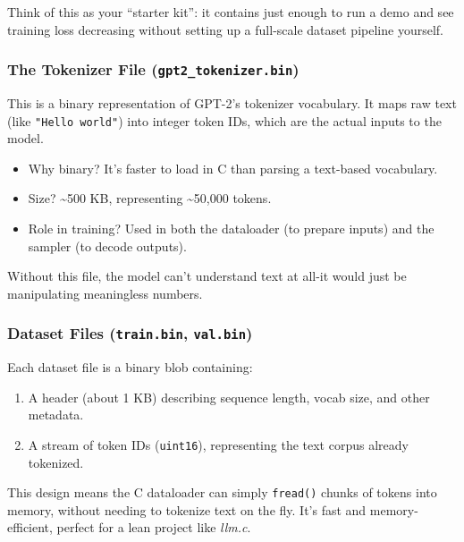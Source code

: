 \documentclass[
  letterpaper,
  DIV=11,
  numbers=noendperiod]{scrreprt}
\providecommand{\tightlist}{%
  \setlength{\itemsep}{0pt}\setlength{\parskip}{0pt}}
\begin{document}
Think of this as your ``starter kit'': it contains just enough to run a
demo and see training loss decreasing without setting up a full-scale
dataset pipeline yourself.

\subsubsection{\texorpdfstring{The Tokenizer File
(\texttt{gpt2\_tokenizer.bin})}{The Tokenizer File (gpt2\_tokenizer.bin)}}\label{the-tokenizer-file-gpt2_tokenizer.bin}

This is a binary representation of GPT-2's tokenizer vocabulary. It maps
raw text (like \texttt{"Hello\ world"}) into integer token IDs, which
are the actual inputs to the model.

\begin{itemize}
\tightlist
\item
  Why binary? It's faster to load in C than parsing a text-based
  vocabulary.
\item
  Size? \textasciitilde500 KB, representing \textasciitilde50,000
  tokens.
\item
  Role in training? Used in both the dataloader (to prepare inputs) and
  the sampler (to decode outputs).
\end{itemize}

Without this file, the model can't understand text at all-it would just
be manipulating meaningless numbers.

\subsubsection{\texorpdfstring{Dataset Files (\texttt{train.bin},
\texttt{val.bin})}{Dataset Files (train.bin, val.bin)}}\label{dataset-files-train.bin-val.bin}

Each dataset file is a binary blob containing:

\begin{enumerate}
\def\labelenumi{\arabic{enumi}.}
\tightlist
\item
  A header (about 1 KB) describing sequence length, vocab size, and
  other metadata.
\item
  A stream of token IDs (\texttt{uint16}), representing the text corpus
  already tokenized.
\end{enumerate}

This design means the C dataloader can simply \texttt{fread()} chunks of
tokens into memory, without needing to tokenize text on the fly. It's
fast and memory-efficient, perfect for a lean project like \emph{llm.c}.
\end{document}
